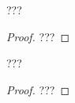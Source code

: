 \begin{fact} \label{euclide-algo}
	??? 
\end{fact}


\begin{proof}
	??? 
\end{proof}



\begin{fact} \label{bachet-bezout}
	??? 
\end{fact}


\begin{proof}
	??? 
\end{proof}
